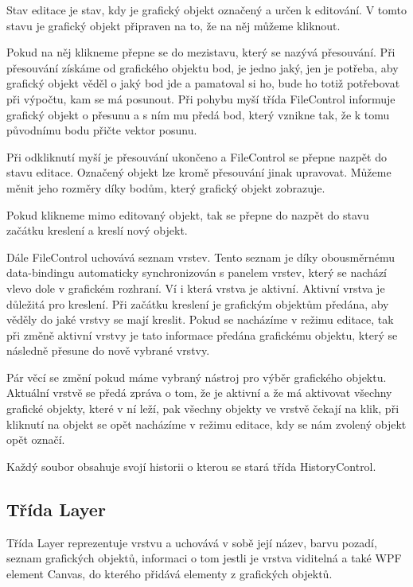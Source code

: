 \documentclass[
  field=inf,
  biblatex,
  glossaries,
  index
]{kidiplom}
\begin{document}
Stav editace je stav, kdy je grafický objekt označený a určen k editování. V tomto stavu je grafický objekt připraven na to, že na něj můžeme kliknout. 

Pokud na něj klikneme přepne se do mezistavu, který se nazývá přesouvání. Při přesouvání získáme od grafického objektu bod, je jedno jaký, jen je potřeba, aby grafický objekt věděl o jaký bod jde a pamatoval si ho, bude ho totiž potřebovat při výpočtu, kam se má posunout. Při pohybu myší třída FileControl informuje grafický objekt o přesunu a s ním mu předá bod, který vznikne tak, že k tomu původnímu bodu přičte vektor posunu.

Při odkliknutí myší je přesouvání ukončeno a FileControl se přepne nazpět do stavu editace. Označený objekt lze kromě přesouvání jinak upravovat. Můžeme měnit jeho rozměry díky bodům, který grafický objekt zobrazuje.

Pokud klikneme mimo editovaný objekt, tak se přepne do nazpět do stavu začátku kreslení a kreslí nový objekt.

Dále FileControl uchovává seznam vrstev. Tento seznam je díky obousměrnému data-bindingu automaticky synchronizován s panelem vrstev, který se nachází vlevo dole v grafickém rozhraní. Ví i která vrstva je aktivní. Aktivní vrstva je důležitá pro kreslení. Při začátku kreslení je grafickým objektům předána, aby věděly do jaké vrstvy se mají kreslit. Pokud se nacházíme v režimu editace, tak při změně aktivní vrstvy je tato informace předána grafickému objektu, který se následně přesune do nově vybrané vrstvy.

Pár věcí se změní pokud máme vybraný nástroj pro výběr grafického objektu. Aktuální vrstvě se předá zpráva o tom, že je aktivní a že má aktivovat všechny grafické objekty, které v ní leží, pak všechny objekty ve vrstvě čekají na klik, při kliknutí na objekt se opět nacházíme v režimu editace, kdy se nám zvolený objekt opět označí.

Každý soubor obsahuje svojí historii o kterou se stará třída HistoryControl.

\subsection{Třída Layer}

Třída Layer reprezentuje vrstvu a uchovává v sobě její název, barvu pozadí, seznam grafických objektů, informaci o tom jestli je vrstva viditelná a také WPF element Canvas, do kterého přidává elementy z grafických objektů. 
\end{document}
